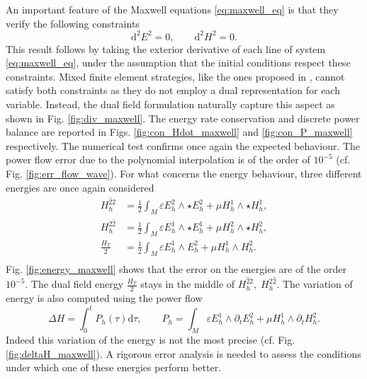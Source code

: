 \documentclass{elsarticle}
\renewcommand\d{\ensuremath{\mathrm{d}}}
\begin{document}
An important feature of the Maxwell equations \eqref{eq:maxwell_eq} is that they verify the following constraints
\begin{equation*}
    \d^2 E^2 = 0, \qquad \d^2 H^2=0.
\end{equation*}
This result follows by taking the exterior derivative of each line of system \eqref{eq:maxwell_eq}, under the assumption that the initial conditions respect these constraints. Mixed finite element strategies, like the ones proposed in \cite{asad2019maxwell,farle2013,payen2020}, cannot satisfy both constraints as they do not employ a dual representation for each variable. Instead, the dual field formulation naturally capture this aspect as shown in Fig. \ref{fig:div_maxwell}. The energy rate conservation and discrete power balance are reported in Figs. \ref{fig:con_Hdot_maxwell} and \ref{fig:con_P_maxwell} respectively. The numerical test confirms once again the expected behaviour. The power flow error due to the polynomial interpolation is of the order of $10^{-5}$ (cf. Fig. \ref{fig:err_flow_wave}). 
For what concerns the energy behaviour, three different energies are once again considered
\begin{equation*}
\begin{aligned}
    H^{\widehat{2}2}_h&= \frac{1}{2} \int_M \varepsilon E^2_h \wedge \star E^2_h + \mu H^1_h \wedge \star H_h^1, \\
    H^{2\widehat{2}}_h&= \frac{1}{2} \int_M \varepsilon E^1_h \wedge \star E^1_h + \mu H^2_h \wedge \star H_h^2, \\
    \frac{H_T}{2} &= \frac{1}{2} \int_M \varepsilon E^1_h \wedge E^2_h + \mu H^1_h \wedge H_h^2. \\
\end{aligned}
\end{equation*}
Fig. \ref{fig:energy_maxwell} shows that the error on the energies are of the order $10^{-5}$. The dual field energy $\frac{H_T}{2}$ stays in the middle of $H^{\widehat{2}2}_h, \; H^{2\widehat{2}}_h$. The variation of energy is also computed using the power flow 
\begin{equation*}
    \Delta H = \int_0^t P_h(\tau) \d\tau, \qquad P_h = \int_M \varepsilon E^1_h \wedge \partial_t E^2_h + \mu H^1_h \wedge \partial_t H_h^2.
\end{equation*}
Indeed this variation of the energy is not the most precise (cf. Fig. \ref{fig:deltaH_maxwell}). A rigorous error analysis is needed to assess the conditions under which one of these energies perform better. 
\end{document}
